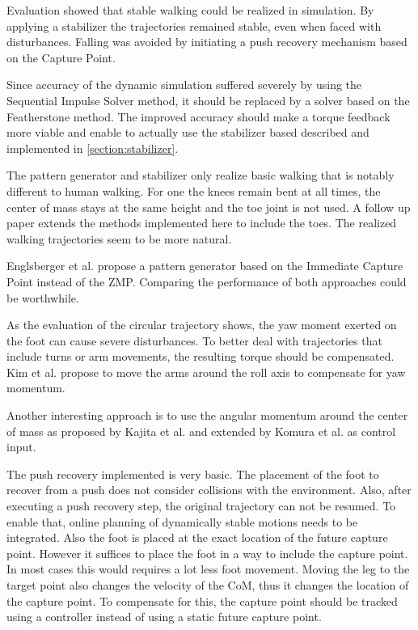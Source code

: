 \documentclass[english,ngerman]{KITreprt}
\begin{document}
Evaluation showed that stable walking could be realized in simulation.
By applying a stabilizer the trajectories remained stable, even when
faced with disturbances. Falling was avoided by initiating a push
recovery mechanism based on the Capture Point.

Since accuracy of the dynamic simulation suffered severely by using the
Sequential Impulse Solver method, it should be replaced by a solver
based on the Featherstone method. The improved accuracy should make a
torque feedback more viable and enable to actually use the stabilizer
based described and implemented in \ref{section:stabilizer}.

The pattern generator and stabilizer only realize basic walking that is
notably different to human walking. For one the knees remain bent at all
times, the center of mass stays at the same height and the toe joint is
not used. A follow up paper \cite{kajita2012evaluation} extends the
methods implemented here to include the toes. The realized walking
trajectories seem to be more natural.

Englsberger et al. \cite{englsberger2011bipedal} propose a pattern
generator based on the Immediate Capture Point instead of the ZMP.
Comparing the performance of both approaches could be worthwhile.

As the evaluation of the circular trajectory shows, the yaw moment
exerted on the foot can cause severe disturbances. To better deal with
trajectories that include turns or arm movements, the resulting torque
should be compensated. Kim et al.\cite{kim2005humanoid} propose to move
the arms around the roll axis to compensate for yaw momentum.

Another interesting approach is to use the angular momentum around the
center of mass as proposed by Kajita et al. \cite{kajita2001balancing}
and extended by Komura et al. \cite{komura2005feedback} as control
input.

The push recovery implemented is very basic. The placement of the foot
to recover from a push does not consider collisions with the
environment. Also, after executing a push recovery step, the original
trajectory can not be resumed. To enable that, online planning of
dynamically stable motions needs to be integrated. Also the foot is
placed at the exact location of the future capture point. However it
suffices to place the foot in a way to include the capture point. In
most cases this would requires a lot less foot movement. Moving the leg
to the target point also changes the velocity of the CoM, thus it
changes the location of the capture point. To compensate for this, the
capture point should be tracked using a controller instead of using a
static future capture point.




\end{document}
